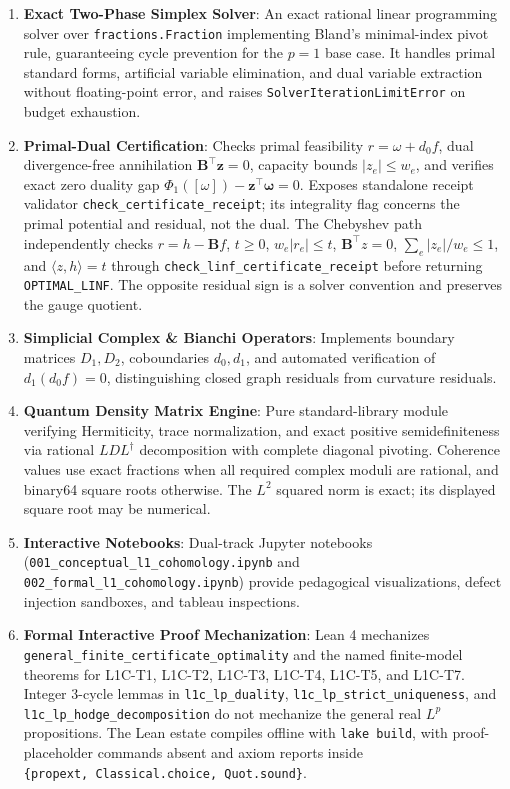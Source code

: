 \documentclass[
]{article}
\providecommand{\tightlist}{%
  \setlength{\itemsep}{0pt}\setlength{\parskip}{0pt}}
\providecommand{\tightlist}{%
  \setlength{\itemsep}{0pt}\setlength{\parskip}{0pt}}
\begin{document}
\begin{enumerate}
\def\labelenumi{\arabic{enumi}.}
\tightlist
\item
  \textbf{Exact Two-Phase Simplex Solver}: An exact rational linear programming solver
  over \texttt{fractions.Fraction} implementing Bland's minimal-index pivot rule,
  guaranteeing cycle prevention for the \(p = 1\) base case. It handles primal standard forms,
  artificial variable elimination, and dual variable extraction without floating-point error,
  and raises \texttt{SolverIterationLimitError} on budget exhaustion.
\item
  \textbf{Primal-Dual Certification}: Checks primal feasibility \(r = \omega + d_0 f\),
  dual divergence-free annihilation \(\mathbf{B}^\top \mathbf{z} = 0\), capacity bounds \(|z_e| \le w_e\),
  and verifies exact zero duality gap \(\Phi_1([\omega]) - \mathbf{z}^\top \boldsymbol{\omega} = 0\).
  Exposes standalone receipt validator \texttt{check\_certificate\_receipt}; its integrality flag concerns the primal potential and residual, not the dual. The Chebyshev path independently checks \(r=h-\mathbf{B}f\), \(t\ge0\), \(w_e|r_e|\le t\), \(\mathbf{B}^\top z=0\), \(\sum_e|z_e|/w_e\le1\), and \(\langle z,h\rangle=t\) through \texttt{check\_linf\_certificate\_receipt} before returning \texttt{OPTIMAL\_LINF}. The opposite residual sign is a solver convention and preserves the gauge quotient.
\item
  \textbf{Simplicial Complex \& Bianchi Operators}: Implements boundary matrices \(D_1, D_2\),
  coboundaries \(d_0, d_1\), and automated verification of \(d_1(d_0 f) = 0\), distinguishing
  closed graph residuals from curvature residuals.
\item
  \textbf{Quantum Density Matrix Engine}: Pure standard-library module verifying
  Hermiticity, trace normalization, and exact positive semidefiniteness via rational
  \(LDL^\dagger\) decomposition with complete diagonal pivoting. Coherence values use exact fractions when all required complex moduli are rational, and binary64 square roots otherwise. The \(L^2\) squared norm is exact; its displayed square root may be numerical.
\item
  \textbf{Interactive Notebooks}: Dual-track Jupyter notebooks (\texttt{001\_conceptual\_l1\_cohomology.ipynb}
  and \texttt{002\_formal\_l1\_cohomology.ipynb}) provide pedagogical visualizations, defect
  injection sandboxes, and tableau inspections.
\item
  \textbf{Formal Interactive Proof Mechanization}: Lean 4 mechanizes
  \texttt{general\_finite\_certificate\_optimality} and the named finite-model theorems
  for L1C-T1, L1C-T2, L1C-T3, L1C-T4, L1C-T5, and L1C-T7. Integer 3-cycle
  lemmas in \texttt{l1c\_lp\_duality}, \texttt{l1c\_lp\_strict\_uniqueness}, and
  \texttt{l1c\_lp\_hodge\_decomposition} do not mechanize the general real \(L^p\) propositions.
  The Lean estate compiles offline with \texttt{lake\ build}, with proof-placeholder
  commands absent and axiom reports inside \texttt{\{propext,\ Classical.choice,\ Quot.sound\}}.
\end{enumerate}
\end{document}
